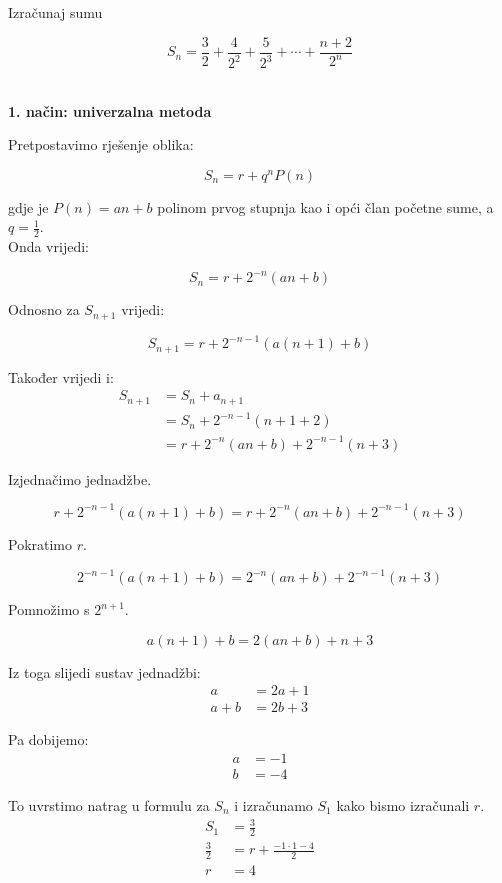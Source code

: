 \documentclass[exam.tex]{subfiles}
\begin{document}
	\begin{task}
		Izračunaj sumu
	
		\[ S_n = \frac{3}{2} + \frac{4}{2^2} + \frac{5}{2^3} + \cdots + \frac{n+2}{2^n} \]\\[1em]
	\end{task} 
	
	\textbf{1. način: univerzalna metoda}
	
	Pretpostavimo rješenje oblika:
	
	\[ S_n = r + q^n P(n) \]
	
	gdje je \( P(n) = an + b \) polinom prvog stupnja kao i opći član početne sume, a \( q = \frac{1}{2} \). \\
	
	Onda vrijedi:
	
	\[ S_n = r + 2^{-n} (an + b) \]
	
	Odnosno za \( S_{n+1} \) vrijedi:
	
	\[ S_{n + 1} = r + 2^{-n-1} (a(n + 1) + b) \]
	
	Također vrijedi i:
	\begin{align*}
		S_{n + 1} &= S_n + a_{n + 1} \\
		&= S_n + 2^{-n - 1} (n + 1 + 2)  \\
		&= r + 2^{-n} (an + b) + 2^{-n-1} (n + 3) 
	\end{align*}
	
	Izjednačimo jednadžbe.
	
	\[ r + 2^{-n-1} (a(n + 1) + b) = r + 2^{-n} (an + b) + 2^{-n-1} (n + 3) \] 
	
	Pokratimo \( r \).
	
	\[ 2^{-n-1} (a(n + 1) + b) = 2^{-n} (an + b) + 2^{-n-1} (n + 3) \]
	
	Pomnožimo s \( 2^{n+1} \).
	
	\[ a(n + 1) + b = 2 (an + b) +  n + 3 \]
	
	Iz toga slijedi sustav jednadžbi:
	\begin{align*}
		a &= 2a + 1 \\
		a + b &= 2b + 3
	\end{align*}
	
	Pa dobijemo:
	\begin{align*}
		a &= -1 \\
		b &= -4
	\end{align*}
	
	To uvrstimo natrag u formulu za \( S_n \) i izračunamo \( S_1 \) kako bismo izračunali \( r \).
	\begin{align*}
		S_1 &= \frac{3}{2} \\ 
		\frac{3}{2} &= r + \frac{-1 \cdot 1 - 4}{2} \\
		r &= 4
	\end{align*}
	
\end{document}
